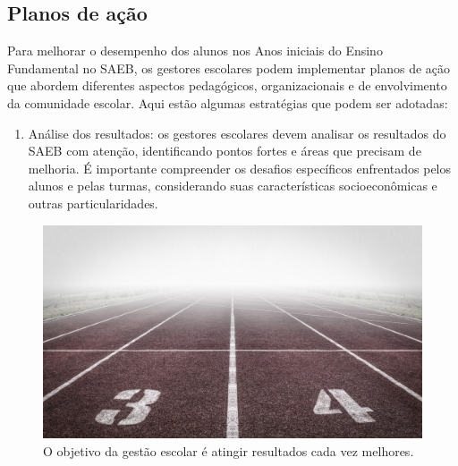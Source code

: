 \subsection{Planos de ação}\label{planos-de-auxe7uxe3o}

Para melhorar o desempenho dos alunos nos Anos iniciais do Ensino
Fundamental no SAEB, os gestores escolares podem implementar planos de
ação que abordem diferentes aspectos pedagógicos, organizacionais e de
envolvimento da comunidade escolar. Aqui estão algumas estratégias que
podem ser adotadas:

\begin{enumerate}
\def\labelenumi{\arabic{enumi}.}
\tightlist
\item
  Análise dos resultados: os gestores escolares devem analisar os
  resultados do SAEB com atenção, identificando pontos fortes e áreas
  que precisam de melhoria. É importante compreender os desafios
  específicos enfrentados pelos alunos e pelas turmas, considerando suas
  características socioeconômicas e outras particularidades.
\end{enumerate}

\begin{figure}
\centering
\includegraphics[width=\textwidth]{./imgs/Imagem006.jpg}
\caption{O objetivo da gestão escolar é atingir resultados cada vez
melhores.}
\end{figure}

